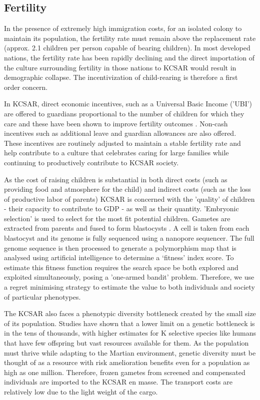 \documentclass[fleqn,10pt]{Stylesheet} %
\begin{document}
\subsection{Fertility}
\label{sec:fertility}
In the presence of extremely high immigration costs, for an isolated colony to maintain its population, the fertility rate must remain above the replacement rate (approx. 2.1 children per person capable of bearing children). In most developed nations, the fertility rate has been rapidly declining and the direct importation of the culture surrounding fertility in those nations to KCSAR would result in demographic collapse. The incentivization of child-rearing is therefore a first order concern.

In KCSAR, direct economic incentives, such as a Universal Basic Income ('UBI') are offered to guardians proportional to the number of children for which they care and these have been shown to improve fertility outcomes \cite{Kalwij, Bjorklund}. Non-cash incentives such as additional leave and guardian allowances are also offered. These incentives are routinely adjusted to maintain a stable fertility rate and help contribute to a culture that celebrates caring for large families while continuing to productively contribute to KCSAR society.

As the cost of raising children is substantial in both direct costs (such as providing food and atmosphere for the child) and indirect costs (such as the loss of productive labor of parents) KCSAR is concerned with the 'quality' of children - their capacity to contribute to GDP - as well as their quantity. 'Embryonic selection' is used to select for the most fit potential children. Gametes are extracted from parents and fused to form blastocysts \cite{Shulman}. A cell is taken from each blastocyst and its genome is fully sequenced using a nanopore sequencer. The full genome sequence is then processed to generate a polymorphism map that is analysed using artificial intelligence to determine a ‘fitness’ index score. To estimate this fitness function requires the search space be both explored and exploited simultaneously, posing a 'one-armed bandit' problem. Therefore, we use a regret minimising strategy to estimate the value to both individuals and society of particular phenotypes.

The KCSAR also faces a phenotypic diversity bottleneck created by the small size of its population. Studies have shown that a lower limit on a genetic bottleneck is in the tens of thousands, with higher estimates for K selective species like humans that have few offspring but vast resources available for them. As the population must thrive while adapting to the Martian environment, genetic diversity must be thought of as a resource with risk amelioration benefits even for a population as high as one million. Therefore, frozen gametes from screened and compensated individuals are imported to the KCSAR en masse. The transport costs are relatively low due to the light weight of the cargo.
\end{document}
